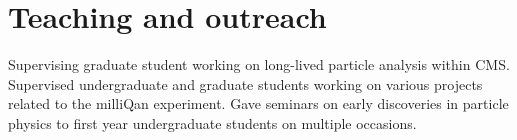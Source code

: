 \section{Teaching and outreach}
 {Supervising graduate student working on long-lived particle analysis within CMS.} 
 {Supervised undergraduate and graduate students working on various projects related to the milliQan experiment.} 
 {Gave seminars on early discoveries in particle physics to first year undergraduate students on multiple occasions.} 
